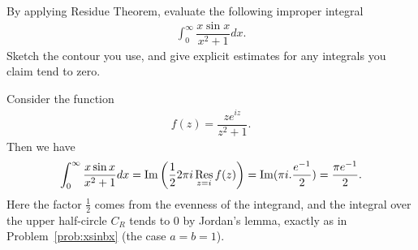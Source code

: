 \begin{problem}
By applying Residue Theorem, evaluate the following improper integral 
\begin{align*}
    \int_0^\infty \dfrac{x\sin x}{x^2+1}dx.
\end{align*}
Sketch the contour you use, and give explicit estimates for any integrals you claim tend to zero.
\begin{solution}
Consider the function 
\begin{align*}
    f(z)=\dfrac{ze^{iz}}{z^2+1}.
\end{align*}
Then we have 
\begin{align*}
     \int_0^\infty \dfrac{x\sin x}{x^2+1}dx={\rm Im}\left( \dfrac{1}{2}2\pi i\mathop{\rm Res}_{z=i}f(z)\right)={\rm Im}(\pi i.\dfrac{e^{-1}}{2})=\dfrac{\pi e^{-1}}{2}.
\end{align*}
Here the factor $\frac{1}{2}$ comes from the evenness of the integrand, and the integral over the upper half-circle $C_R$ tends to $0$ by Jordan's lemma, exactly as in Problem~\ref{prob:xsinbx} (the case $a=b=1$).
\end{solution}
\end{problem}

